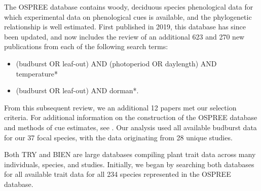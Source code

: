 \documentclass{article}\usepackage[]{graphicx}\usepackage[]{color}
\begin{document}
The OSPREE database contains woody, deciduous species phenological data for which experimental data on phenological cues is available, and the phylogenetic relationship is well estimated. First published in 2019, this database has since been updated, and now includes the review of an additional 623 and 270 new publications from each of the following search terms:
\begin{itemize}
\item (budburst OR leaf-out) AND (photoperiod OR daylength) AND temperature* 
\item (budburst OR leaf-out) AND dorman*.
\end{itemize}
 From this subsequent review, we an additional 12 papers met our selection criteria. For additional information on the construction of the OSPREE database and methods of cue estimates, see \citep{OSPREE}. Our analysis used all available budburst data for our 37 focal species, with the data originating from 28 unique studies. 

Both TRY and BIEN are large databases compiling plant trait data across many individuals, species, and studies. Initially, we began by searching both databases for all available trait data for all 234 species represented in the OSPREE database.  

\end{document}
